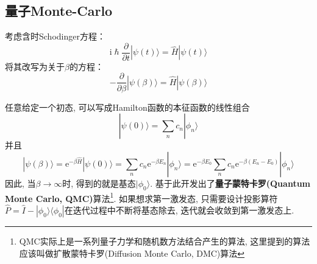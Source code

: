         \subsection{量子Monte-Carlo}

        考虑含时Schodinger方程：
        \begin{equation}
            \mathrm{i}\hslash \frac {\partial}{\partial t} | \psi(t) \rangle = \hat{H}|\psi(t) \rangle
        \end{equation}
        将其改写为关于$\beta$的方程：
        \begin{equation}
            -\frac {\partial}{\partial \beta} |\psi(\beta) \rangle = \hat{H} |\psi(\beta) \rangle
        \end{equation}

        任意给定一个初态, 可以写成Hamilton函数的本征函数的线性组合
        \begin{equation}
            |\psi(0) \rangle = \sum_n c_n |\phi_n\rangle
        \end{equation}
        并且
        \begin{equation}
            |\psi(\beta) \rangle = \mathrm{e}^{-\beta \hat{H}} |\psi(0) \rangle = \sum_n c_n\mathrm{e}^{-\beta E_n}|\phi_n \rangle = \mathrm{e}^{-\beta E_0} \sum_n c_n \mathrm{e}^{-\beta(E_n-E_0)} |\phi_n \rangle
        \end{equation}
        因此, 当$\beta \to \infty$时, 得到的就是基态$|\phi_0 \rangle$. 基于此开发出了\textbf{量子蒙特卡罗(Quantum Monte Carlo, QMC)}算法\footnote{QMC实际上是一系列量子力学和随机数方法结合产生的算法, 这里提到的算法应该叫做扩散蒙特卡罗(Diffusion Monte Carlo, DMC)算法}. 如果想求第一激发态, 只需要设计投影算符$\hat P = \hat I - |\phi_0 \rangle\langle \phi_0|$在迭代过程中不断将基态除去, 迭代就会收敛到第一激发态上. 

    
    